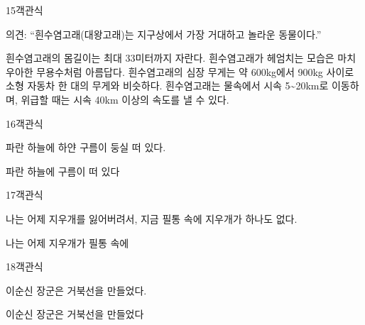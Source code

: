 \documentclass[fs95,seriesFre]{korfarm-base}
\begin{document}
\begin{kfQBlock}{15}{객관식}
\begin{kfEvidence}의견: “흰수염고래(대왕고래)는 지구상에서 가장 거대하고 놀라운 동물이다.”\end{kfEvidence}
\begin{kfChoices}
\kfChoice 흰수염고래의 몸길이는 최대 33미터까지 자란다.
\kfChoice 흰수염고래가 헤엄치는 모습은 마치 우아한 무용수처럼 아름답다.
\kfChoice 흰수염고래의 심장 무게는 약 600kg에서 900kg 사이로 소형 자동차 한 대의 무게와 비슷하다.
\kfChoice 흰수염고래는 물속에서 시속 5\textasciitilde{}20km로 이동하며, 위급할 때는 시속 40km 이상의 속도를 낼 수 있다.
\end{kfChoices}
\end{kfQBlock}

\begin{kfQBlock}{16}{객관식}
\begin{kfEvidence}파란 하늘에 하얀 구름이 둥실 떠 있다.\end{kfEvidence}
\begin{kfChoices}
\kfChoice 파란
\kfChoice 하늘에
\kfChoice 구름이
\kfChoice 떠 있다
\end{kfChoices}
\end{kfQBlock}

\begin{kfQBlock}{17}{객관식}
\begin{kfEvidence}나는 어제 지우개를 잃어버려서, 지금 필통 속에 지우개가 하나도 없다.\end{kfEvidence}
\begin{kfChoices}
\kfChoice 나는
\kfChoice 어제
\kfChoice 지우개가
\kfChoice 필통 속에
\end{kfChoices}
\end{kfQBlock}

\begin{kfQBlock}{18}{객관식}
\begin{kfEvidence}이순신 장군은 거북선을 만들었다.\end{kfEvidence}
\begin{kfChoices}
\kfChoice 이순신
\kfChoice 장군은
\kfChoice 거북선을
\kfChoice 만들었다
\end{kfChoices}
\end{kfQBlock}
\end{document}
